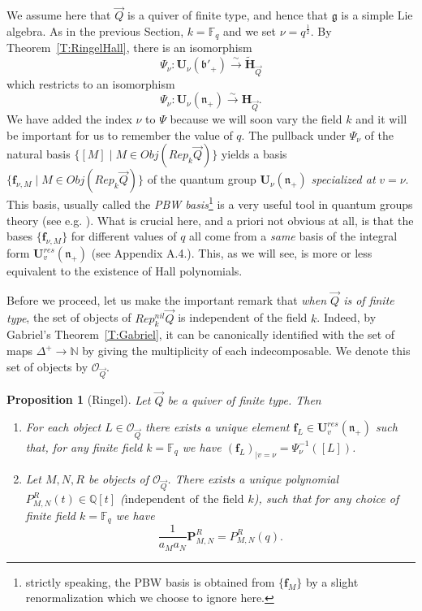 \documentclass[a4paper,10pt]{amsart}
\def\Q{\mathbb{Q}}
\def\H{\mathbf{H}}
\def\U{\mathbf{U}}
\def\N{\mathbb{N}}
\def\g{\mathfrak{g}}
\def\bo{\mathfrak{b}}
\def\n{\mathfrak{n}}
\newtheorem{prop}[theo]{Proposition}
\numberwithin{equation}{section}
\begin{document}
We assume here that $\vec{Q}$ is a quiver of finite type, and hence that $\g$ is a simple Lie algebra. As in the previous Section, $k=\mathbb{F}_q$ and we set $\nu=q^{\frac{1}{2}}$. By Theorem~\ref{T:RingelHall}, there is an isomorphism
$$\Psi_{\nu} :\U_{\nu}(\bo'_+) \stackrel{\sim}{\to} \widetilde{\H}_{\vec{Q}}$$
which restricts to an isomorphism
$$\Psi_{\nu} :\U_{\nu}(\n_+) \stackrel{\sim}{\to} {\H}_{\vec{Q}}.$$
We have added the index $\nu$ to $\Psi$ because we will soon vary the field $k$ and it will be important for us to remember the value of $q$. The pullback under $\Psi_{\nu}$ of the natural basis
$\{[M]\;|\; M \in Obj(Rep_{k}\vec{Q})\}$ yields a basis $\{\mathbf{f}_{\nu,M}\;|\; M \in Obj(Rep_{k}\vec{Q})\}$ of the quantum group $\U_{\nu}(\n_+)$ \textit{specialized at} $v=\nu$. This basis, usually called the \textit{PBW basis}\footnote{strictly speaking, the PBW basis is obtained from $\{\mathbf{f}_M\}$ by a slight renormalization which we choose to ignore here.} is a very useful tool in quantum groups theory (see e.g. \cite{LusztigPBW}). What is crucial here, and a priori not obvious at all, is that the bases $\{\mathbf{f}_{\nu,M}\}$ for different values of $q$ all come from a \textit{same} basis of the integral form $\U_v^{res}(\n_+)$ (see Appendix A.4.). This, as we will see, is more or less equivalent to the existence of Hall polynomials.

\vspace{.1in}

Before we proceed, let us make the important remark that \textit{when $\vec{Q}$ is of finite type}, the set of objects of $Rep^{nil}_k\vec{Q}$ is independent of the field $k$. Indeed, by Gabriel's Theorem~\ref{T:Gabriel}, it can be canonically identified with the set of maps $\Delta^+ \to \N$ by giving the multiplicity of each indecomposable. We denote this set of objects by $\mathcal{O}_{\vec{Q}}$.

\vspace{.1in}

\begin{prop}[Ringel]\label{P:Hallpolquiver} Let $\vec{Q}$ be a quiver of finite type. Then
\begin{enumerate}
\item[i)] For each object $L \in \mathcal{O}_{\vec{Q}}$ there exists a unique element $\mathbf{f}_{L} \in \U_v^{res}(\n_+)$ such that, for any finite field $k=\mathbb{F}_q$ we have $(\mathbf{f}_{L})_{|v=\nu}=\Psi_{\nu}^{-1}([L])$.
\item[ii)] Let $M,N,R$ be objects of $\mathcal{O}_{\vec{Q}}$. There exists a unique polynomial $P_{M,N}^R(t) \in \Q[t]$ ($\mathrm{independent}$ $\mathrm{of}$ $\mathrm{the}$ $\mathrm{field}$ $k$), such that for any choice of finite field $k=\mathbb{F}_q$ we have
$$\frac{1}{a_Ma_N}\mathbf{P}^R_{M,N}=P_{M,N}^R(q).$$
\end{enumerate}
\end{prop}
\end{document}

